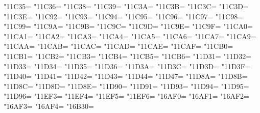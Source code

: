 \XeTeXcharclass"11C35=\KclassCM
\XeTeXcharclass"11C36=\KclassCM
\XeTeXcharclass"11C38=\KclassCM
\XeTeXcharclass"11C39=\KclassCM
\XeTeXcharclass"11C3A=\KclassCM
\XeTeXcharclass"11C3B=\KclassCM
\XeTeXcharclass"11C3C=\KclassCM
\XeTeXcharclass"11C3D=\KclassCM
\XeTeXcharclass"11C3E=\KclassCM
\XeTeXcharclass"11C92=\KclassCM
\XeTeXcharclass"11C93=\KclassCM
\XeTeXcharclass"11C94=\KclassCM
\XeTeXcharclass"11C95=\KclassCM
\XeTeXcharclass"11C96=\KclassCM
\XeTeXcharclass"11C97=\KclassCM
\XeTeXcharclass"11C98=\KclassCM
\XeTeXcharclass"11C99=\KclassCM
\XeTeXcharclass"11C9A=\KclassCM
\XeTeXcharclass"11C9B=\KclassCM
\XeTeXcharclass"11C9C=\KclassCM
\XeTeXcharclass"11C9D=\KclassCM
\XeTeXcharclass"11C9E=\KclassCM
\XeTeXcharclass"11C9F=\KclassCM
\XeTeXcharclass"11CA0=\KclassCM
\XeTeXcharclass"11CA1=\KclassCM
\XeTeXcharclass"11CA2=\KclassCM
\XeTeXcharclass"11CA3=\KclassCM
\XeTeXcharclass"11CA4=\KclassCM
\XeTeXcharclass"11CA5=\KclassCM
\XeTeXcharclass"11CA6=\KclassCM
\XeTeXcharclass"11CA7=\KclassCM
\XeTeXcharclass"11CA9=\KclassCM
\XeTeXcharclass"11CAA=\KclassCM
\XeTeXcharclass"11CAB=\KclassCM
\XeTeXcharclass"11CAC=\KclassCM
\XeTeXcharclass"11CAD=\KclassCM
\XeTeXcharclass"11CAE=\KclassCM
\XeTeXcharclass"11CAF=\KclassCM
\XeTeXcharclass"11CB0=\KclassCM
\XeTeXcharclass"11CB1=\KclassCM
\XeTeXcharclass"11CB2=\KclassCM
\XeTeXcharclass"11CB3=\KclassCM
\XeTeXcharclass"11CB4=\KclassCM
\XeTeXcharclass"11CB5=\KclassCM
\XeTeXcharclass"11CB6=\KclassCM
\XeTeXcharclass"11D31=\KclassCM
\XeTeXcharclass"11D32=\KclassCM
\XeTeXcharclass"11D33=\KclassCM
\XeTeXcharclass"11D34=\KclassCM
\XeTeXcharclass"11D35=\KclassCM
\XeTeXcharclass"11D36=\KclassCM
\XeTeXcharclass"11D3A=\KclassCM
\XeTeXcharclass"11D3C=\KclassCM
\XeTeXcharclass"11D3D=\KclassCM
\XeTeXcharclass"11D3F=\KclassCM
\XeTeXcharclass"11D40=\KclassCM
\XeTeXcharclass"11D41=\KclassCM
\XeTeXcharclass"11D42=\KclassCM
\XeTeXcharclass"11D43=\KclassCM
\XeTeXcharclass"11D44=\KclassCM
\XeTeXcharclass"11D47=\KclassCM
\XeTeXcharclass"11D8A=\KclassCM
\XeTeXcharclass"11D8B=\KclassCM
\XeTeXcharclass"11D8C=\KclassCM
\XeTeXcharclass"11D8D=\KclassCM
\XeTeXcharclass"11D8E=\KclassCM
\XeTeXcharclass"11D90=\KclassCM
\XeTeXcharclass"11D91=\KclassCM
\XeTeXcharclass"11D93=\KclassCM
\XeTeXcharclass"11D94=\KclassCM
\XeTeXcharclass"11D95=\KclassCM
\XeTeXcharclass"11D96=\KclassCM
\XeTeXcharclass"11EF3=\KclassCM
\XeTeXcharclass"11EF4=\KclassCM
\XeTeXcharclass"11EF5=\KclassCM
\XeTeXcharclass"11EF6=\KclassCM
\XeTeXcharclass"16AF0=\KclassCM
\XeTeXcharclass"16AF1=\KclassCM
\XeTeXcharclass"16AF2=\KclassCM
\XeTeXcharclass"16AF3=\KclassCM
\XeTeXcharclass"16AF4=\KclassCM
\XeTeXcharclass"16B30=\KclassCM
